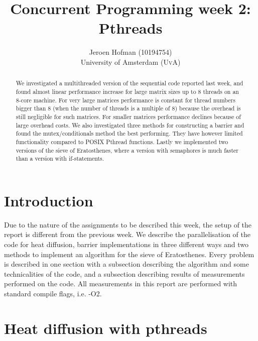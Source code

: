 \documentclass[11pt,a4paper,onecolumn]{article}
\author{Jeroen Hofman (10194754) \\
[15pt] University of Amsterdam (\textsc{UvA})}
\title{Concurrent Programming week 2:\\
  Pthreads
		}
\begin{document}
\maketitle
\captionsetup{width=0.8\textwidth}
\thispagestyle{empty}

\begin{center}
\begin{abstract}
\small{We investigated a multithreaded version of the sequential code reported last week, and found almost linear performance increase for large matrix sizes up to 8 threads on an 8-core machine. For very large matrices performance is constant for thread numbers bigger than 8 (when the number of threads is a multiple of 8) because the overhead is still negligible for such matrices. For smaller matrices performance declines because of large overhead costs. We also investigated three methods for constructing a barrier and found the mutex/conditionals method the best performing. They have however limited functionality compared to POSIX Pthread functions. Lastly we implemented two versions of the sieve of Eratosthenes, where a version with semaphores is much faster than a version with if-statements.}
\end{abstract}
\end{center}

\newpage
\tableofcontents
\newpage

\section{Introduction}
Due to the nature of the assignments to be described this week, the setup of the report is different from the previous week. We describe the parallelisation of the code for heat diffusion, barrier implementations in three different ways and two methods to implement an algorithm for the sieve of Eratosthenes. Every problem is described in one section with a subsection describing the algorithm and some technicalities of the code, and a subsection describing results of measurements performed on the code. All measurements in this report are performed with standard compile flags, i.e. -O2.

\section{Heat diffusion with pthreads}
\end{document}
